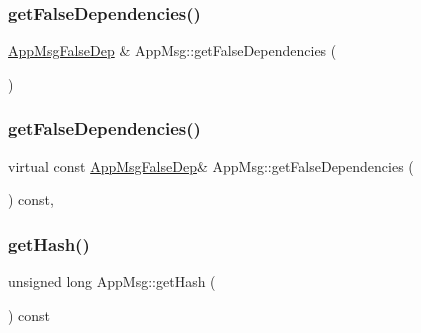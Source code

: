 \mbox{\label{class_app_msg_a0578104e6c8983ba88270192b263e3c9}} 
\subsubsection{\texorpdfstring{get\+False\+Dependencies()}{getFalseDependencies()}\hspace{0.1cm}{\footnotesize\ttfamily [1/2]}}
{\footnotesize\ttfamily \hyperlink{_app_msg__m_8h_a2b8cadfd13c916ddccf5a213ca34d8ee}{App\+Msg\+False\+Dep} \& App\+Msg\+::get\+False\+Dependencies (\begin{DoxyParamCaption}{ }\end{DoxyParamCaption})\hspace{0.3cm}{\ttfamily [virtual]}}

\mbox{\label{class_app_msg_aa9c4237b7fafc07ee9ba6d798941cc06}} 
\subsubsection{\texorpdfstring{get\+False\+Dependencies()}{getFalseDependencies()}\hspace{0.1cm}{\footnotesize\ttfamily [2/2]}}
{\footnotesize\ttfamily virtual const \hyperlink{_app_msg__m_8h_a2b8cadfd13c916ddccf5a213ca34d8ee}{App\+Msg\+False\+Dep}\& App\+Msg\+::get\+False\+Dependencies (\begin{DoxyParamCaption}{ }\end{DoxyParamCaption}) const\hspace{0.3cm}{\ttfamily [inline]}, {\ttfamily [virtual]}}

\mbox{\label{class_app_msg_a59f818e49bf28c2fd494e6668ef13367}} 
\subsubsection{\texorpdfstring{get\+Hash()}{getHash()}}
{\footnotesize\ttfamily unsigned long App\+Msg\+::get\+Hash (\begin{DoxyParamCaption}{ }\end{DoxyParamCaption}) const\hspace{0.3cm}{\ttfamily [virtual]}}

